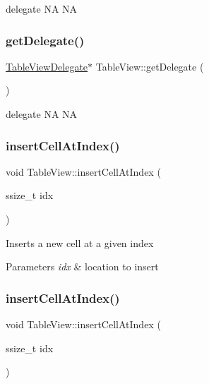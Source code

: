 delegate  NA  NA \mbox{\label{classTableView_a1530f5f201ca31501a85e27a3b45453f}} 
\subsubsection{\texorpdfstring{get\+Delegate()}{getDelegate()}\hspace{0.1cm}{\footnotesize\ttfamily [2/2]}}
{\footnotesize\ttfamily \hyperlink{classTableViewDelegate}{Table\+View\+Delegate}$\ast$ Table\+View\+::get\+Delegate (\begin{DoxyParamCaption}{ }\end{DoxyParamCaption})\hspace{0.3cm}{\ttfamily [inline]}}

delegate  NA  NA \mbox{\label{classTableView_a78419c05170575d818d08809dfab0b2f}} 
\subsubsection{\texorpdfstring{insert\+Cell\+At\+Index()}{insertCellAtIndex()}\hspace{0.1cm}{\footnotesize\ttfamily [1/2]}}
{\footnotesize\ttfamily void Table\+View\+::insert\+Cell\+At\+Index (\begin{DoxyParamCaption}\item[{ssize\+\_\+t}]{idx }\end{DoxyParamCaption})}

Inserts a new cell at a given index


\begin{DoxyParams}{Parameters}
{\em idx} & location to insert \\
\hline
\end{DoxyParams}
\mbox{\label{classTableView_a78419c05170575d818d08809dfab0b2f}} 
\subsubsection{\texorpdfstring{insert\+Cell\+At\+Index()}{insertCellAtIndex()}\hspace{0.1cm}{\footnotesize\ttfamily [2/2]}}
{\footnotesize\ttfamily void Table\+View\+::insert\+Cell\+At\+Index (\begin{DoxyParamCaption}\item[{ssize\+\_\+t}]{idx }\end{DoxyParamCaption})}

